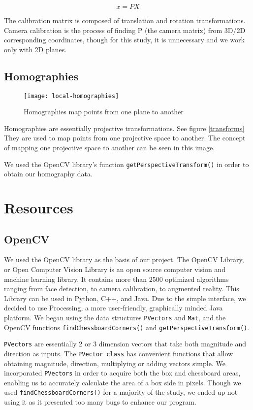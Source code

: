 \documentclass[11pt, twoside, reqno]{book}
\begin{document}
\[
x=PX
\]

The calibration matrix is composed of translation and rotation transformations. Camera calibration is the process of finding P (the camera matrix) from 3D/2D corresponding coordinates, though for this study, it is unnecessary and we work only with 2D planes. 


\subsection{Homographies}

\begin{figure}[H]
	\begin{center}
		\graphicspath{ {images/} }
		\texttt{[image: local-homographies]} 
		\caption{Homographies map points from one plane to another  \cite{homography}}
	\end{center}
\end{figure}

 Homographies are essentially projective transformations. See figure \ref{transforms}  
 They are used to map points from one projective space to another\cite{Solem}. The concept of mapping one projective space to another can be seen in this image. 
 

We used the OpenCV library's function \texttt{getPerspectiveTransform()} in order to obtain our homography data. 



\section{Resources}
\label{label}
\subsection{OpenCV}
We used the OpenCV library as the basis of our project. The OpenCV Library, or Open Computer Vision Library is an open source computer vision and machine learning library. It contains more than 2500 optimized algorithms ranging from face detection, to camera calibration, to augmented reality. This Library can be used in Python, C++, and Java\cite{opencvCC}.  
Due to the simple interface, we decided to use Processing, a more user-friendly, graphically minded Java platform. We began using the data structures \texttt{PVectors} and \texttt{Mat}, and the OpenCV functions \texttt{findChessboardCorners()} and \texttt{getPerspectiveTransform()}. 



\texttt{PVectors} are essentially 2 or 3 dimension vectors that take both magnitude and direction as inputs. The \texttt{PVector class} has convenient functions that allow obtaining magnitude, direction, multiplying or adding vectors simple. We incorporated \texttt{PVectors} in order to acquire both the box and chessboard areas, enabling us to accurately calculate the area of a box side in pixels. Though we used \texttt{findChessboardCorners()} for a majority of the study, we ended up not using it as it presented too many bugs to enhance our program. 
\end{document}

